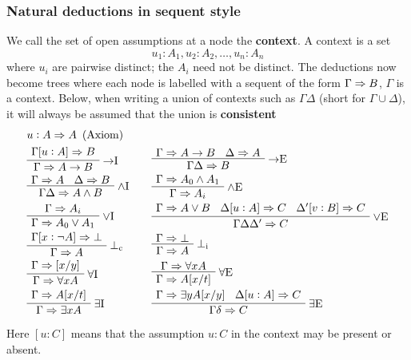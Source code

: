 \documentclass[11pt]{article}
\def \EBA {\EnableBpAbbreviations}
\def \RL[#1]{\RightLabel{#1}}
\begin{document}
\subsubsection{Natural deductions in sequent style}
\label{sec:orge6a6d08}
We call the set of open assumptions at a node the \textbf{context}. A context is a set
\begin{equation*}
u_1:A_1,u_2:A_2,\dots,u_n:A_n
\end{equation*}
where \(u_i\) are pairwise distinct; the \(A_i\) need not be distinct. The
deductions now become trees where each node is labelled with a sequent of the
form \(\Gamma\Rightarrow B\), \(\Gamma\) is a context. Below, when writing a union of
contexts such as \(\Gamma\Delta\) (short for \(\Gamma\cup\Delta\)), it will
always be assumed that the union is \textbf{consistent}
\begin{alignat*}{2}
&u:A\Ra A\e(\text{Axiom})&&\\
&\AxiomC{$\Gamma[u:A]\Ra B$}\RightLabel{$\to$I}
\UnaryInfC{$\Gamma\Ra A\to B$}\DisplayProof&&
\AxiomC{$\Gamma\Ra A\to B$}
\AxiomC{$\Delta\Ra A$}\RightLabel{$\to$E}\BinaryInfC{$\Gamma\Delta\Ra B$}
\DisplayProof\\
&\AxiomC{$\Gamma\Ra A$}\AxiomC{$\Delta\Ra B$}\RightLabel{$\wedge$I}
\BinaryInfC{$\Gamma\Delta\Ra A\wedge B$}\DisplayProof\quad&&
\AxiomC{$\Gamma\Ra A_0\wedge A_1$}\RightLabel{$\wedge$E}
\UnaryInfC{$\Gamma\Ra A_i$}\DisplayProof\\
&\AxiomC{$\Gamma\Ra A_i$}\RightLabel{$\vee$I}
\UnaryInfC{$\Gamma\Ra A_0\vee A_1$}\DisplayProof&&
\def\defaultHypSeparation{\hskip 1pt}
\AxiomC{$\Gamma\Ra A\vee B$}
\AxiomC{$\Delta[u:A]\Ra C$}
\AxiomC{$\Delta'[v:B]\Ra C$}
\RightLabel{$\vee$E}
\TrinaryInfC{$\Gamma\Delta\Delta'\Ra C$}\DisplayProof\\
&\AxiomC{$\Gamma[x:\neg A]\Ra\bot$}\RightLabel{$\bot_\text{c}$}
\UnaryInfC{$\Gamma\Ra A$}\DisplayProof&&
\AxiomC{$\Gamma\Ra\bot$}\RightLabel{$\bot_{\text{i}}$}
\UnaryInfC{$\Gamma\Ra A$}\DisplayProof\\
&\EBA\AXC{$\Gamma\Ra[x/y]$}
\RightLabel{$\forall$I}
\UIC{$\Gamma\Ra\forall xA$}\DP&&\EBA
\AXC{$\Gamma\Ra\forall xA$}\RL{$\forall$E}
\UIC{$\Gamma\Ra A[x/t]$}\DP\\
&\EBA\AXC{$\Gamma\Ra A[x/t]$}
\RL{$\exists$I}\UIC{$\Gamma\Ra\exists xA$}\DP&&
\EBA\AXC{$\Gamma\Ra\exists yA[x/y]$}
\AXC{$\Delta[u:A]\Ra C$}\RL{$\exists$E}
\BIC{$\Gamma\delta\Ra C$}\DP
\end{alignat*}

Here \([u:C]\) means that the assumption \(u:C\) in the context may be present or
absent.
\end{document}

